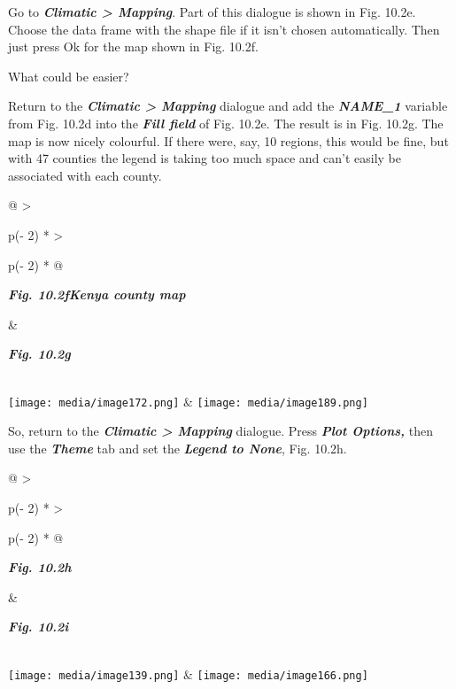 \documentclass[
  letterpaper,
  DIV=11,
  numbers=noendperiod]{scrreprt}
\begin{document}
Go to \textbf{\emph{Climatic \textgreater{} Mapping}}. Part of this
dialogue is shown in Fig. 10.2e. Choose the data frame with the shape
file if it isn't chosen automatically. Then just press Ok for the map
shown in Fig. 10.2f.

What could be easier?

Return to the \textbf{\emph{Climatic \textgreater{} Mapping}} dialogue
and add the \textbf{\emph{NAME\_1}} variable from Fig. 10.2d into the
\textbf{\emph{Fill field}} of Fig. 10.2e. The result is in Fig. 10.2g.
The map is now nicely colourful. If there were, say, 10 regions, this
would be fine, but with 47 counties the legend is taking too much space
and can't easily be associated with each county.

\begin{longtable}[]{@{}
  >{\raggedright\arraybackslash}p{(\columnwidth - 2\tabcolsep) * }
  >{\raggedright\arraybackslash}p{(\columnwidth - 2\tabcolsep) * }@{}}
\toprule\noalign{}
\begin{minipage}[b]{\linewidth}\raggedright
\textbf{\emph{Fig. 10.2fKenya county map}}
\end{minipage} & \begin{minipage}[b]{\linewidth}\raggedright
\textbf{\emph{Fig. 10.2g}}
\end{minipage} \\
\midrule\noalign{}
\endhead
\bottomrule\noalign{}
\endlastfoot
\texttt{[image: media/image172.png]} &
\texttt{[image: media/image189.png]} \\
\end{longtable}

So, return to the \textbf{\emph{Climatic \textgreater{} Mapping}}
dialogue. Press \textbf{\emph{Plot Options,}} then use the
\textbf{\emph{Theme}} tab and set the \textbf{\emph{Legend to None}},
Fig. 10.2h.

\begin{longtable}[]{@{}
  >{\raggedright\arraybackslash}p{(\columnwidth - 2\tabcolsep) * }
  >{\raggedright\arraybackslash}p{(\columnwidth - 2\tabcolsep) * }@{}}
\toprule\noalign{}
\begin{minipage}[b]{\linewidth}\raggedright
\textbf{\emph{Fig. 10.2h}}
\end{minipage} & \begin{minipage}[b]{\linewidth}\raggedright
\textbf{\emph{Fig. 10.2i}}
\end{minipage} \\
\midrule\noalign{}
\endhead
\bottomrule\noalign{}
\endlastfoot
\texttt{[image: media/image139.png]} &
\texttt{[image: media/image166.png]} \\
\end{longtable}
\end{document}
